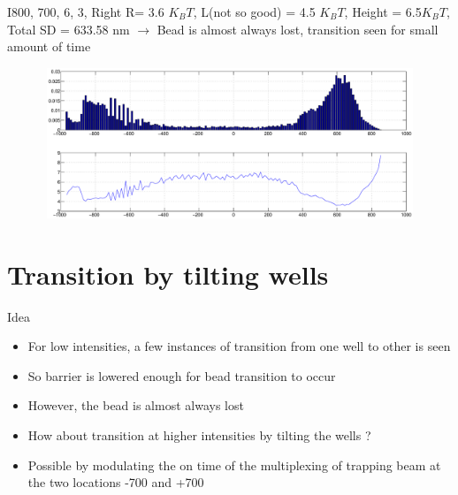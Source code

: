 \documentclass{beamer}
\begin{document}
\begin{frame}{I800, 700, 6, 3, Right} 
R= 3.6 $K_BT$, L(not so good) = 4.5 $K_BT$, Height = 6.5$K_BT$, Total SD = 633.58 nm $\rightarrow$ Bead is almost always lost, transition seen for small amount of time
\begin{figure}
    \centering
    \includegraphics[height=4.5cm,width=12cm]{I800_right_1.eps}
    \label{fig:graph22}
\end{figure}


\end{frame}

\section{Transition by tilting wells}
\begin{frame}{Idea} 

\begin{itemize}

\item For low intensities, a few instances of transition from one well to other is seen
\item So barrier is lowered enough for bead transition to occur
\item However, the bead is almost always lost
\item How about transition at higher intensities by tilting the wells ?
\item Possible by modulating the on time of the multiplexing of trapping beam at the two locations -700 and +700

\end{itemize}


\end{frame}
\end{document}
